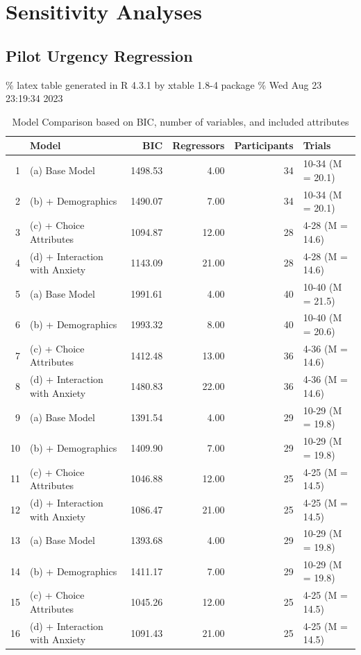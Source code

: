 \documentclass[
]{report}
\begin{document}
\hypertarget{sensitivity-analyses}{%
\section{Sensitivity Analyses}\label{sensitivity-analyses}}

\hypertarget{pilot-urgency-regression}{%
\subsection{Pilot Urgency Regression}\label{pilot-urgency-regression}}

\% latex table generated in R 4.3.1 by xtable 1.8-4 package \% Wed Aug
23 23:19:34 2023

\hypertarget{tbl-sensitivity}{}
\begin{table}[ht]
\caption{\label{tbl-sensitivity}Model Comparison based on BIC, number of variables, and included
attributes }\tabularnewline

\centering
\begin{tabular}{rlrrrl}
  \hline
 & Model & BIC & Regressors & Participants & Trials \\ 
  \hline
1 & (a) Base Model & 1498.53 & 4.00 &  34 & 10-34 (M = 20.1) \\ 
  2 & (b) + Demographics & 1490.07 & 7.00 &  34 & 10-34 (M = 20.1) \\ 
  3 & (c) + Choice Attributes & 1094.87 & 12.00 &  28 & 4-28 (M = 14.6) \\ 
  4 & (d) + Interaction with Anxiety & 1143.09 & 21.00 &  28 & 4-28 (M = 14.6) \\ 
  5 & (a) Base Model & 1991.61 & 4.00 &  40 & 10-40 (M = 21.5) \\ 
  6 & (b) + Demographics & 1993.32 & 8.00 &  40 & 10-40 (M = 20.6) \\ 
  7 & (c) + Choice Attributes & 1412.48 & 13.00 &  36 & 4-36 (M = 14.6) \\ 
  8 & (d) + Interaction with Anxiety & 1480.83 & 22.00 &  36 & 4-36 (M = 14.6) \\ 
  9 & (a) Base Model & 1391.54 & 4.00 &  29 & 10-29 (M = 19.8) \\ 
  10 & (b) + Demographics & 1409.90 & 7.00 &  29 & 10-29 (M = 19.8) \\ 
  11 & (c) + Choice Attributes & 1046.88 & 12.00 &  25 & 4-25 (M = 14.5) \\ 
  12 & (d) + Interaction with Anxiety & 1086.47 & 21.00 &  25 & 4-25 (M = 14.5) \\ 
  13 & (a) Base Model & 1393.68 & 4.00 &  29 & 10-29 (M = 19.8) \\ 
  14 & (b) + Demographics & 1411.17 & 7.00 &  29 & 10-29 (M = 19.8) \\ 
  15 & (c) + Choice Attributes & 1045.26 & 12.00 &  25 & 4-25 (M = 14.5) \\ 
  16 & (d) + Interaction with Anxiety & 1091.43 & 21.00 &  25 & 4-25 (M = 14.5) \\ 
   \hline
\end{tabular}
\end{table}
\end{document}
